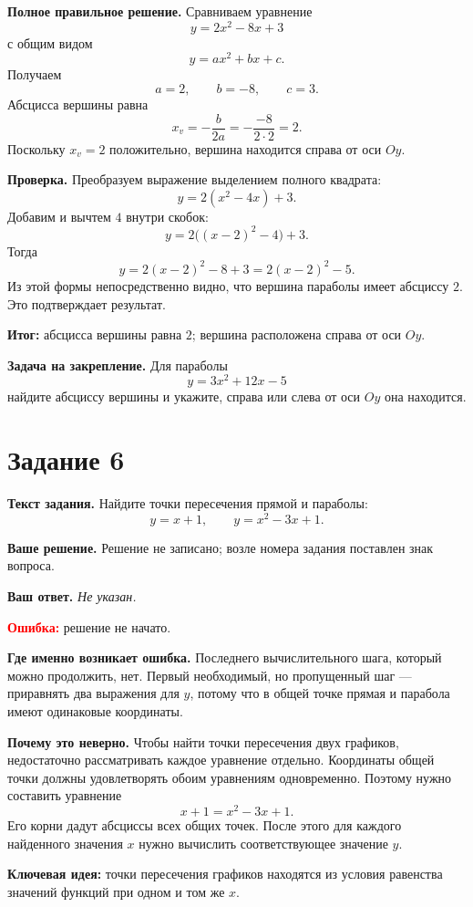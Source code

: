 \documentclass[12pt,a4paper]{article}
\newcommand{\studentanswer}[1]{\textit{#1}}
\begin{document}
\textbf{Полное правильное решение.}
Сравниваем уравнение
\[
y=2x^2-8x+3
\]
с общим видом
\[
y=ax^2+bx+c.
\]
Получаем
\[
a=2, \qquad b=-8, \qquad c=3.
\]
Абсцисса вершины равна
\[
x_v=-\frac{b}{2a}=-\frac{-8}{2\cdot 2}=2.
\]
Поскольку $x_v=2$ положительно, вершина находится справа от оси $Oy$.

\textbf{Проверка.}
Преобразуем выражение выделением полного квадрата:
\[
y=2(x^2-4x)+3.
\]
Добавим и вычтем $4$ внутри скобок:
\[
y=2\bigl((x-2)^2-4\bigr)+3.
\]
Тогда
\[
y=2(x-2)^2-8+3=2(x-2)^2-5.
\]
Из этой формы непосредственно видно, что вершина параболы имеет абсциссу $2$. Это подтверждает результат.

\textcolor{teal!60!black}{\textbf{Итог:}}
абсцисса вершины равна $2$; вершина расположена справа от оси $Oy$.

\textbf{Задача на закрепление.}
Для параболы
\[
y=3x^2+12x-5
\]
найдите абсциссу вершины и укажите, справа или слева от оси $Oy$ она находится.

\newpage
{}\label{task:6}
\section*{Задание 6}

\textbf{Текст задания.}
Найдите точки пересечения прямой и параболы:
\[
y=x+1, \qquad y=x^2-3x+1.
\]

\textbf{Ваше решение.}
Решение не записано; возле номера задания поставлен знак вопроса.

\textbf{Ваш ответ.}
\studentanswer{Не указан.}

\textcolor{red}{\textbf{Ошибка:}} решение не начато.

\textbf{Где именно возникает ошибка.}
Последнего вычислительного шага, который можно продолжить, нет. Первый необходимый, но пропущенный шаг --- приравнять два выражения для $y$, потому что в общей точке прямая и парабола имеют одинаковые координаты.

\textbf{Почему это неверно.}
Чтобы найти точки пересечения двух графиков, недостаточно рассматривать каждое уравнение отдельно. Координаты общей точки должны удовлетворять обоим уравнениям одновременно. Поэтому нужно составить уравнение
\[
x+1=x^2-3x+1.
\]
Его корни дадут абсциссы всех общих точек. После этого для каждого найденного значения $x$ нужно вычислить соответствующее значение $y$.

\textcolor{blue!60!black}{\textbf{Ключевая идея:}}
точки пересечения графиков находятся из условия равенства значений функций при одном и том же $x$.
\end{document}
